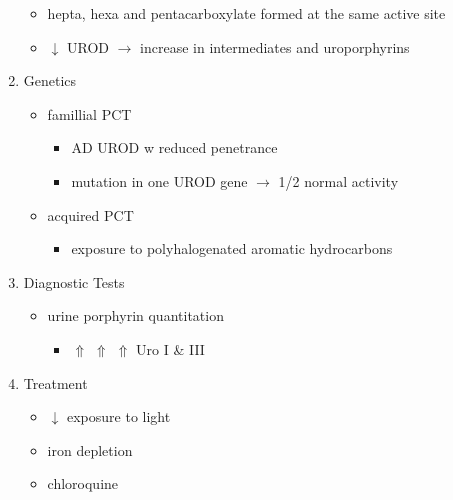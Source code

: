 \documentclass[12pt]{scrartcl}
\begin{document}
\begin{enumerate}
\begin{itemize}
\item hepta, hexa and pentacarboxylate formed at the same active site
\item \(\downarrow\) UROD \(\to\) increase in intermediates and uroporphyrins
\end{itemize}
\item Genetics
\label{sec:orgdcd1398}
\begin{itemize}
\item famillial PCT
\begin{itemize}
\item AD UROD w reduced penetrance
\item mutation in one UROD gene \(\to\) 1/2 normal activity
\end{itemize}
\item acquired PCT 
\begin{itemize}
\item exposure to polyhalogenated aromatic hydrocarbons
\end{itemize}
\end{itemize}
\item Diagnostic Tests
\label{sec:orgc223068}
\begin{itemize}
\item urine porphyrin quantitation
\begin{itemize}
\item \(\Uparrow\) \(\Uparrow\) \(\Uparrow\) Uro I \& III
\end{itemize}
\end{itemize}
\item Treatment
\label{sec:org7d3aab8}
\begin{itemize}
\item \(\downarrow\) exposure to light
\item iron depletion
\item chloroquine
\end{itemize}
\end{enumerate}
\end{document}
